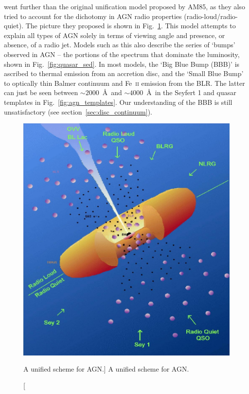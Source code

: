 \citet[][UP95]{UP95} went further than the original unification model
proposed by AM85, as they also tried to account for the dichotomy in 
AGN radio properties (radio-loud/radio-quiet).
The picture they proposed is shown in Fig.~\ref{fig:unification}.
This model attempts to explain all types of AGN 
solely in terms of viewing angle
and presence, or absence, of a radio jet. Models such as this also 
describe the series of `bumps' observed in AGN -- the portions
of the spectrum that dominate the luminosity, shown in Fig.~\ref{fig:quasar_sed}. 
In most models, the `Big Blue Bump (BBB)' is ascribed to thermal 
emission from an accretion disc, and the `Small Blue Bump' to optically 
thin Balmer continuum and Fe~\textsc{ii} emission from the BLR.
The latter can just be seen between $\sim2000$~\AA\ and 
$\sim4000$~\AA\ in the Seyfert 1 and 
quasar templates in Fig.~\ref{fig:agn_templates}.
Our understanding of the BBB is still unsatisfactory 
(see section~\ref{sec:disc_continuum}).

\begin{figure}
\centering
\includegraphics[width=1.0\textwidth]{figures/01-intro/up95.png}
\caption
[A unified scheme for AGN.]
{
A unified scheme for AGN.
} 
\label{fig:unification}
\end{figure} 

